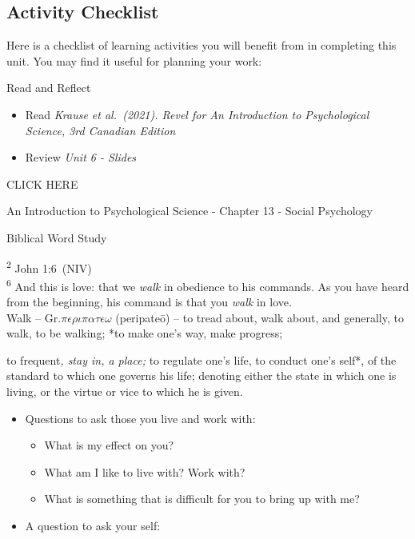 \documentclass[
]{book}
\providecommand{\tightlist}{%
  \setlength{\itemsep}{0pt}\setlength{\parskip}{0pt}}
\begin{document}
\hypertarget{activity-checklist-5}{%
\subsection*{Activity Checklist}\label{activity-checklist-5}}

Here is a checklist of learning activities you will benefit from in completing this unit. You may find it useful for planning your work:

\begin{reflect}
{Read and Reflect}

\begin{itemize}
\item
  Read \emph{Krause et al.~(2021). Revel for An Introduction to Psychological Science, 3rd Canadian Edition}
\item
  Review \emph{Unit 6 - Slides}
\end{itemize}

CLICK HERE

An Introduction to Psychological Science - Chapter 13 - Social Psychology

Biblical Word Study

\textsuperscript{2} John 1:6~(NIV)\\
\textsuperscript{6} And this is love: that we \emph{walk} in obedience to his commands. As you have heard from the beginning, his command is that you \emph{walk} in love.\\
Walk -- Gr.\(\pi\epsilon\rho\iota\pi\alpha\tau\epsilon\omega\) (peripateō) -- to tread about, walk about, and generally, to walk, to be walking; *to make one's way, make progress;

to frequent\emph{, stay in, a place;
}to regulate one's life, to conduct one's self*, of the standard to which one governs his life; denoting either the state in which one is living, or the virtue or vice to which he is given.

\begin{itemize}
\tightlist
\item
  Questions to ask those you live and work with:

  \begin{itemize}
  \tightlist
  \item
    What is my effect on you?
  \item
    What am I like to live with? Work with?
  \item
    What is something that is difficult for you to bring up with me?
  \end{itemize}
\item
  A question to ask your self:


\end{itemize}
\end{reflect}
\end{document}
